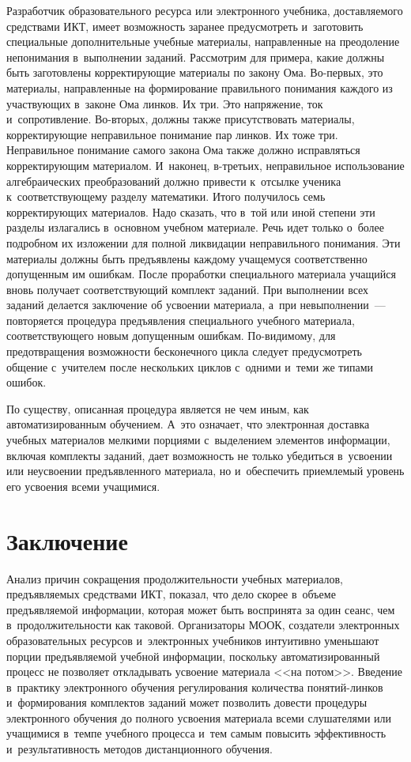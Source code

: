 \begin{multicols}{2}
  Разработчик образовательного ресурса или электронного учебника, 
доставляемого средствами ИКТ, имеет возможность заранее предусмотреть 
и~заготовить специальные дополнительные учебные материалы, направленные 
на преодоление непонимания в~выполнении заданий. Рассмотрим для примера, 
какие должны быть заготовлены корректирующие материалы по закону Ома. 
Во-пер\-вых, это материалы, направленные на формирование правильного 
понимания каждого из участвующих в~законе Ома линков. Их три. Это 
напряжение, ток и~сопротивление. Во-вто\-рых, должны также присутствовать материалы, 
корректирующие неправильное понимание пар линков. Их тоже три. 
Неправильное понимание самого закона Ома также должно исправляться 
корректирующим материалом. И~наконец, в-третьих, неправильное использование 
алгебраических %
преобразований должно привести к~отсылке ученика 
к~соответствующему разделу математики. Итого получилось семь 
корректирующих материалов. Надо сказать, что в~той или иной степени эти 
разделы излагались в~основном учебном материале. Речь идет только о~более 
подробном их изложении для полной ликвидации неправильного понимания. 
Эти материалы должны быть предъявлены каждому учащемуся соответственно 
до\-пущенным им ошибкам. После проработки специального материала 
учащийся вновь получает соответств\-ующий комплект заданий. При 
выполнении всех заданий делается заключение об усво\-ении материала, а~при 
невыполнении~--- повторяется процедура предъявления специального учебного 
материала, соответствующего новым допущенным ошибкам. По-ви\-ди\-мо\-му, 
для предотвращения возможности бесконечного цикла следует предусмотреть 
общение с~учителем после нескольких циклов с~одними и~теми же типами 
ошибок.
  
  По существу, описанная процедура является не чем иным, как 
автоматизированным обучением. А~это означает, что электронная доставка 
учебных материалов мелкими порциями с~выделением элементов информации, 
включая комплекты заданий, дает возможность не только убедиться в~усвоении 
или неусвоении предъявленного материала, но и~обеспечить приемлемый 
уровень его усвоения всеми учащимися.
  
\section{Заключение}

  Анализ причин сокращения продолжитель\-ности учебных материалов, 
предъявляемых средствами ИКТ, показал, что дело скорее в~объеме 
предъявляемой информации, которая может быть воспринята за один сеанс, 
чем в~продолжительности как таковой. Организаторы МООК, создатели 
электронных образовательных ресурсов и~электронных учебников интуитивно 
уменьшают порции предъявляемой учебной информации, поскольку 
автоматизированный процесс не позволяет откладывать усвоение материала 
<<на потом>>. Введение в~практику электронного обучения регулирования 
количества по\-ня\-тий-лин\-ков и~формирования комплектов заданий может 
позволить довести процедуры электронного обучения до полного усво\-ения 
материала всеми слушателями или учащимися в~темпе учебного процесса и~тем 
самым повысить эффективность и~результативность методов дистанционного 
обуче\-ния.
  

\end{multicols}
